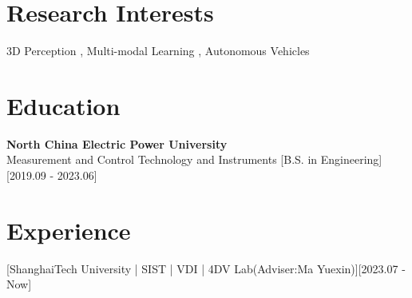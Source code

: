 \documentclass{resume}
\begin{document}

\ResumeTitle

\section{Research Interests}
3D Perception , Multi-modal Learning , Autonomous Vehicles


\section{Education}


\ResumeItem
{\textbf{North China Electric Power University}\\
\textnormal{Measurement and Control Technology and Instruments}}
[B.S. in Engineering]
[2019.09 - 2023.06]

\section{Experience}
[ShanghaiTech University | SIST | VDI | 4DV Lab(Adviser:Ma Yuexin)][2023.07 - Now]
\end{document}
